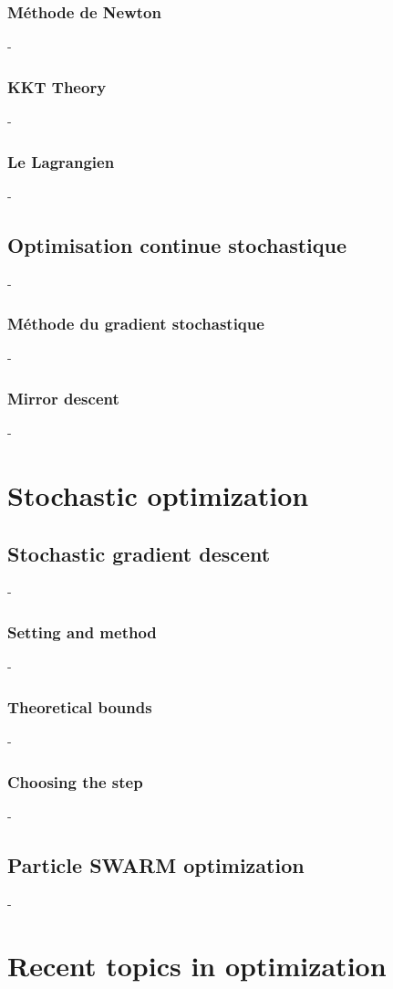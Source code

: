 \documentclass[12pt,openany,oneside]{book}
\theoremstyle{definition}
\numberwithin{definition}{section}
\numberwithin{theorem}{section}
\numberwithin{corollary}{section}
\numberwithin{proposition}{section}
\numberwithin{notation}{section}
\numberwithin{remark}{section}
\numberwithin{hypothesis}{section}
\numberwithin{example}{section}
\begin{document}
\subsection{Méthode de Newton}-
\subsection{KKT Theory}-
\subsection{Le Lagrangien}-
\section{Optimisation continue stochastique}-
\subsection{Méthode du gradient stochastique}-
\subsection{Mirror descent}-

\chapter{Stochastic optimization}

\section{Stochastic gradient descent}-
\subsection{Setting and method}-
\subsection{Theoretical bounds}-
\subsection{Choosing the step}-
\section{Particle SWARM optimization}-

\chapter{Recent topics in optimization}
\end{document}
